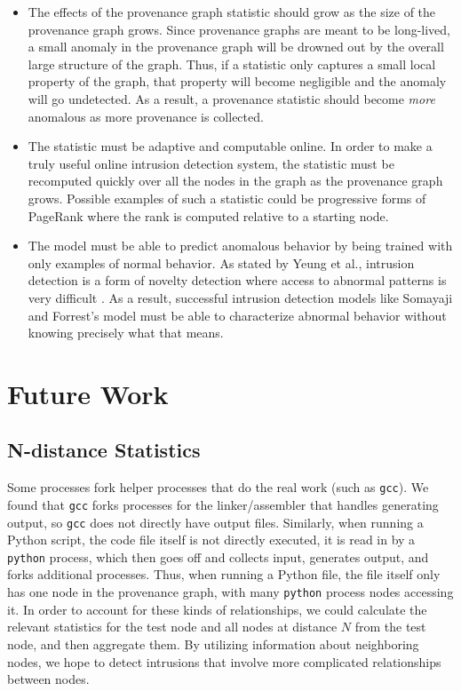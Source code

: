 \documentclass[10pt,twocolumn]{article}
\begin{document}
\begin{itemize}
\item The effects of the provenance graph statistic should grow as the size of the provenance graph grows. Since provenance graphs are meant to be long-lived, a small anomaly in the provenance graph will be drowned out by the overall large structure of the graph. Thus, if a statistic only captures a small local property of the graph, that property will become negligible and the anomaly will go undetected. As a result, a provenance statistic should become {\em more} anomalous as more provenance is collected.

\item The statistic must be adaptive and computable online. In order to make a truly useful online intrusion detection system, the statistic must be recomputed quickly over all the nodes in the graph as the provenance graph grows. Possible examples of such a statistic could be progressive forms of PageRank where the rank is computed relative to a starting node.

\item The model must be able to predict anomalous behavior by being trained with only examples of normal behavior. As stated by Yeung et al., intrusion detection is a form of novelty detection where access to abnormal patterns is very difficult \cite{parzen}. As a result, successful intrusion detection models like Somayaji and Forrest's model must be able to characterize abnormal behavior without knowing precisely what that means.
\end{itemize}



%

\section{Future Work}

\subsection{N-distance Statistics}
Some processes fork helper processes that do the real work (such as \texttt{gcc}). We found that \texttt{gcc} forks processes for the linker/assembler that handles generating output, so \texttt{gcc} does not directly have output files. Similarly, when running a Python script, the code file itself is not directly executed, it is read in by a \texttt{python} process, which then goes off and collects input, generates output, and forks additional processes. Thus, when running a Python file, the file itself only has one node in the provenance graph, with many \texttt{python} process nodes accessing it. In order to account for these kinds of relationships, we could calculate the relevant statistics for the test node and all nodes at distance $N$ from the test node, and then aggregate them. By utilizing information about neighboring nodes, we hope to detect intrusions that involve more complicated relationships
between nodes.
\end{document}
